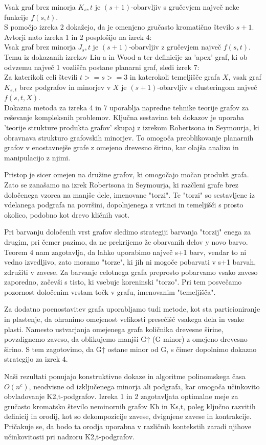 \documentclass{article}
\begin{document}
Vsak graf brez minorja $K_s,t$ je $(s+1)$-obarvljiv s gručevjem največ neke funkcije $f(s,t)$.\\
S pomočjo izreka 2 dokažejo, da je omenjeno gručasto kromatično število $s+1$.
\\
Avtorji nato izreka 1 in 2 posplošijo na izrek 4:\\
Vsak graf brez minorja $J_s,t$ je $(s+1)$-obarvljiv z gručevjem največ $f(s, t)$.
\\
Temu iz dokazanih izrekov Liu-a in Wood-a ter definicije za 'apex' graf, ki ob odvzemu največ 1 vozlišča postane planarni graf, sledi izrek 7:\\
Za katerikoli celi števili $t >= s >= 3$ in katerokoli temeljišče grafa $X$, vsak graf $K_{s,t}$ brez podgrafov in minorjev v $X$ je $(s + 1)$-obarvljiv s clusteringom največ $f(s, t, X)$.\\

Dokazna metoda za izreka 4 in 7 uporablja napredne tehnike teorije grafov za reševanje kompleksnih problemov. Ključna sestavina teh dokazov je uporaba 'teorije strukture produkta grafov' skupaj z izrekom Robertsona in Seymourja, ki obravnava strukturo grafovskih minorjev. To omogoča preoblikovanje planarnih grafov v enostavnejše grafe z omejeno drevesno širino, kar olajša analizo in manipulacijo z njimi.

Pristop je sicer omejen na družine grafov, ki omogočajo močan produkt grafa. Zato se zanašamo na izrek Robertsona in Seymourja, ki razčleni grafe brez določenega vzorca na manjše dele, imenovane "torzi". Te "torzi" so sestavljene iz vdelanega podgrafa na površini, dopolnjenega z vrtinci in temeljišči s prosto okolico, podobno kot drevo kličnih vsot.


Pri barvanju določenih vrst grafov sledimo strategiji barvanja "torzij" enega za drugim, pri čemer pazimo, da ne prekrijemo že obarvanih delov y novo barvo. Teorem 4 nam zagotavlja, da lahko uporabimo največ s+1 barv, vendar to ni vedno izvedljivo, zato moramo "torze", ki jih ni mogoče pobarvati v s+1 barvah, združiti v zavese. Za barvanje celotnega grafa preprosto pobarvamo vsako zaveso zaporedno, začevši s tisto, ki vsebuje koreninski "torzo". Pri tem posvečamo pozornost določenim vrstam točk v grafu, imenovanim "temeljišča".

Za dodatno poenostavitev grafa uporabljamo tudi metode, kot sta particioniranje in plastenje, da ohranimo omejenost velikosti presečišč vsakega dela in vsake plasti. Namesto ustvarjanja omejenega grafa količnika drevesne širine, povzdignemo zaveso, da oblikujemo manjši G↑ (G minor) z omejeno drevesno širino. S tem zagotovimo, da G↑ ostane minor od G, s čimer dopolnimo dokazno strategijo za izrek 4.



Naši rezultati ponujajo konstruktivne dokaze in algoritme polinomskega časa $O(n^c)$, neodvisne od izključenega minorja ali podgrafa, kar omogoča učinkovito obvladovanje K2,t-podgrafov. Izreka 1 in 2 zagotavljata optimalne meje za gručasto kromatsko število neminornih grafov Kh in Ks,t, poleg ključno razvitih definicij in orodij, kot so dekompozicije zavese, dvignjene zavese in kontrakcije. Pričakuje se, da bodo ta orodja uporabna v različnih kontekstih zaradi njihove učinkovitosti pri nadzoru K2,t-podgrafov.
\end{document}
